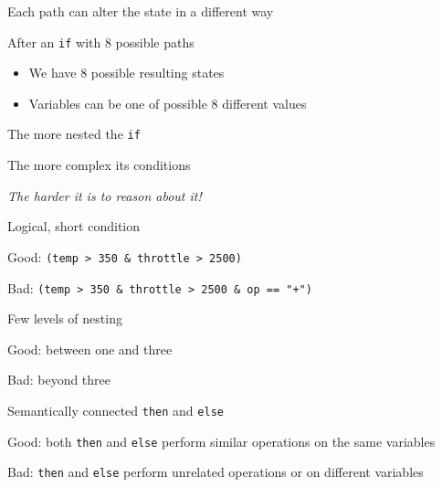 \documentclass{beamer}
\begin{document}
\begin{slide}{
\item Each path can alter the state in a different way
\item After an \texttt{if} with 8 possible paths
\begin{itemize}
\item We have 8 possible resulting states
\item Variables can be one of possible 8 different values
\end{itemize}
}\end{slide}

\begin{slide}{
\item The more nested the \texttt{if}
\item The more complex its conditions
\item \textit{The harder it is to reason about it!}
}\end{slide}

\begin{slide}{
\item Logical, short condition
\item Good: \texttt{(temp > 350 \& throttle > 2500)}
\item Bad: \texttt{(temp > 350 \& throttle > 2500 \& op == "+")}
}\end{slide}

\begin{slide}{
\item Few levels of nesting
\item Good: between one and three
\item Bad: beyond three
}\end{slide}

\begin{slide}{
\item Semantically connected \texttt{then} and \texttt{else}
\item Good: both \texttt{then} and \texttt{else} perform similar operations on the same variables
\item Bad: \texttt{then} and \texttt{else} perform unrelated operations or on different variables
}\end{slide}
\end{document}
